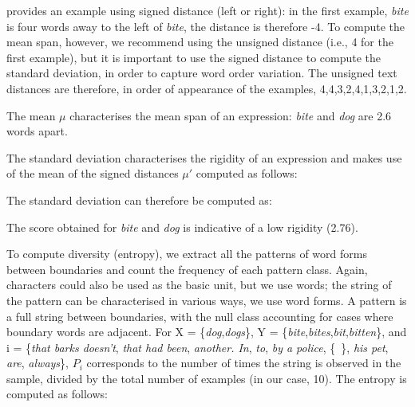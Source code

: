 \documentclass[output=paper]{langsci/langscibook}
\begin{document}
 provides an example using signed distance (left or right): in
the first example, \textit{bite} is four words away to the left of \textit{bite}, the
distance is therefore -4. To compute the mean span, however, we
recommend using the unsigned distance (i.e., 4 for the first example),
but it is important to use the signed distance to compute the standard
deviation, in order to capture word order variation. The unsigned text
distances are therefore, in order of appearance of the examples,
4,4,3,2,4,1,3,2,1,2.



The mean  $\mu$ characterises the mean span of an expression: \textit{bite} and
\textit{dog} are 2.6 words apart.




The standard deviation characterises the rigidity of an expression and
makes use of the mean of the signed distances  $\mu'$ computed as
follows:




The standard deviation can therefore be computed as:







The score obtained for \textit{bite} and \textit{dog} is indicative of a low rigidity (2.76).



To compute diversity (entropy), we extract all the patterns of word
forms between boundaries and count the frequency of each pattern class.
Again, characters could also be used as the basic unit, but we use
words; the string of the pattern can be characterised in various ways,
we use word forms. A pattern is a full string between boundaries, with
the null class accounting for cases where boundary words are adjacent.
For X = \{\textit{dog},\textit{dogs}\}, Y = \{\textit{bite},\textit{bites},\textit{bit},\textit{bitten}\}, and i = \{\textit{that
barks doesn’t}, \textit{that had been}, \textit{another. In}, \textit{to}, \textit{by a police},
\{~\}, \textit{his pet}, \textit{are}, \textit{always}\},  $P_i$ corresponds to the number of
times the string is observed in the sample, divided by the total number
of examples (in our case, 10). The entropy is computed as follows:
\end{document}

